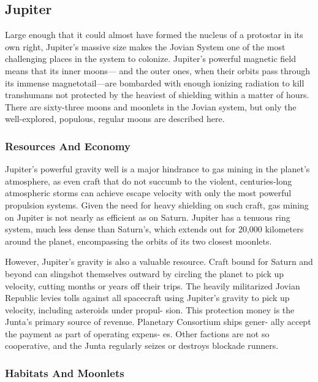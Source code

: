 \subsection{Jupiter}

Large enough that it could almost have formed the 
nucleus of a protostar in its own right, Jupiter's massive size makes the Jovian System one of the most 
challenging places in the system to colonize. Jupiter's 
powerful magnetic field means that its inner moons—
and the outer ones, when their orbits pass through its 
immense magnetotail—are bombarded with enough 
ionizing radiation to kill transhumans not protected 
by the heaviest of shielding within a matter of hours. 
There are sixty-three moons and moonlets in the 
Jovian system, but only the well-explored, populous, 
regular moons are described here.

\subsubsection{Resources And Economy}

Jupiter's powerful gravity well is a major hindrance 
to gas mining in the planet's atmosphere, as even craft 
that do not succumb to the violent, centuries-long 
atmospheric storms can achieve escape velocity with 
only the most powerful propulsion systems. Given the 
need for heavy shielding on such craft, gas mining on 
Jupiter is not nearly as efficient as on Saturn. Jupiter has a tenuous ring system, much less dense than 
Saturn's, which extends out for 20,000 kilometers 
around the planet, encompassing the orbits of its two 
closest moonlets.

However, Jupiter's gravity is also a valuable 
resource. Craft bound for Saturn and beyond can 
slingshot themselves outward by circling the planet 
to pick up velocity, cutting months or years off their 
trips. The heavily militarized Jovian Republic levies 
tolls against all spacecraft using Jupiter's gravity to 
pick up velocity, including asteroids under propul-
sion. This protection money is the Junta's primary 
source of revenue. Planetary Consortium ships gener-
ally accept the payment as part of operating expens-
es. Other factions are not so cooperative, and the 
Junta regularly seizes or destroys blockade runners.

\subsubsection{Habitats And Moonlets}

